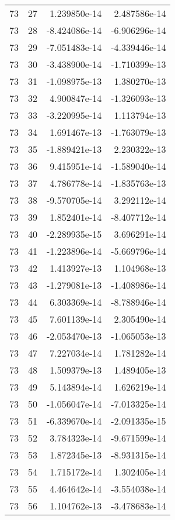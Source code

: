 \begin{tabular}{rrrr}
  73 &   27 &  1.239850e-14 &  2.487586e-14 \\
  73 &   28 & -8.424086e-14 & -6.906296e-14 \\
  73 &   29 & -7.051483e-14 & -4.339446e-14 \\
  73 &   30 & -3.438900e-14 & -1.710399e-13 \\
  73 &   31 & -1.098975e-13 &  1.380270e-13 \\
  73 &   32 &  4.900847e-14 & -1.326093e-13 \\
  73 &   33 & -3.220995e-14 &  1.113794e-13 \\
  73 &   34 &  1.691467e-13 & -1.763079e-13 \\
  73 &   35 & -1.889421e-13 &  2.230322e-13 \\
  73 &   36 &  9.415951e-14 & -1.589040e-14 \\
  73 &   37 &  4.786778e-14 & -1.835763e-13 \\
  73 &   38 & -9.570705e-14 &  3.292112e-14 \\
  73 &   39 &  1.852401e-14 & -8.407712e-14 \\
  73 &   40 & -2.289935e-15 &  3.696291e-14 \\
  73 &   41 & -1.223896e-14 & -5.669796e-14 \\
  73 &   42 &  1.413927e-13 &  1.104968e-13 \\
  73 &   43 & -1.279081e-13 & -1.408986e-14 \\
  73 &   44 &  6.303369e-14 & -8.788946e-14 \\
  73 &   45 &  7.601139e-14 &  2.305490e-14 \\
  73 &   46 & -2.053470e-13 & -1.065053e-13 \\
  73 &   47 &  7.227034e-14 &  1.781282e-14 \\
  73 &   48 &  1.509379e-13 &  1.489405e-13 \\
  73 &   49 &  5.143894e-14 &  1.626219e-14 \\
  73 &   50 & -1.056047e-14 & -7.013325e-14 \\
  73 &   51 & -6.339670e-14 & -2.091335e-15 \\
  73 &   52 &  3.784323e-14 & -9.671599e-14 \\
  73 &   53 &  1.872345e-13 & -8.931315e-14 \\
  73 &   54 &  1.715172e-14 &  1.302405e-14 \\
  73 &   55 &  4.464642e-14 & -3.554038e-14 \\
  73 &   56 &  1.104762e-13 & -3.478683e-14 \\

\end{tabular}
